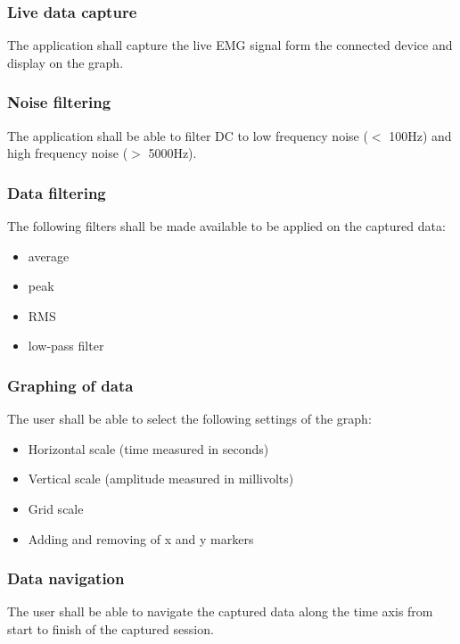 \documentclass[12pt,a4paper]{article}
\begin{document}
\subsubsection{Live data capture}

The application shall capture the live EMG signal form the connected device and display on the graph.

\subsubsection{Noise filtering}

The application shall be able to filter DC to low frequency noise ($<$ 100Hz) and high frequency noise ($>$ 5000Hz). 

\subsubsection{Data filtering}

The following filters shall be made available to be applied on the captured data:

\begin{itemize}
\item average
\item peak
\item RMS
\item low-pass filter
\end{itemize}

\subsubsection{Graphing of data}

The user shall be able to select the following settings of the graph:

\begin{itemize}
\item Horizontal scale (time measured in seconds)
\item Vertical scale (amplitude measured in millivolts)
\item Grid scale 
\item Adding and removing of x and y markers
\end{itemize}

\subsubsection{Data navigation}

The user shall be able to navigate the captured data along the time axis from start to finish of the captured session.
\end{document}
